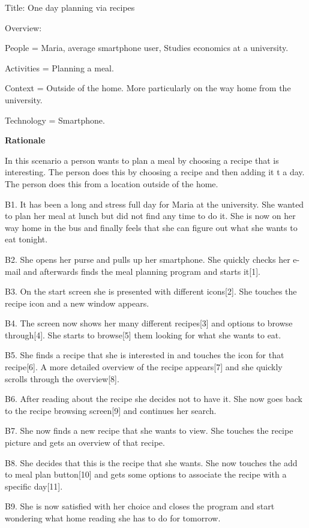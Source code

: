 Title: One day planning via recipes

Overview:

	People = Maria, average smartphone user, Studies economics at a university. 
	
	Activities = Planning a meal.

	Context = Outside of the home. More particularly on the way home from the university.

	Technology = Smartphone.

\textbf{Rationale}

In this scenario a person wants to plan a meal by choosing a recipe that is interesting. The person does this by choosing a recipe and then adding it t a day. The person does this from a location outside of the home. 

	B1. It has been a long and stress full day for Maria at the university. She wanted to plan her meal at lunch but did not find any time to do it. She is now on her way home in the bus and finally feels that she can figure out what she wants to eat tonight.

	B2. She opens her purse and pulls up her smartphone. She quickly checks her e-mail and afterwards finds the meal planning program and starts it[1]. 

	B3. On the start screen she is presented with different icons[2]. She touches the recipe icon and a new window appears.

	B4. The screen now shows her many different recipes[3] and options to browse through[4]. She starts to browse[5] them looking for what she wants to eat. 

	B5. She finds a recipe that she is interested in and touches the icon for that recipe[6]. A more detailed overview of the recipe appears[7] and she quickly scrolls through the overview[8].

	B6. After reading about the recipe she decides not to have it. She now goes back to the recipe browsing screen[9] and continues her search.

	B7. She now finds a new recipe that she wants to view. She touches the recipe picture and gets an overview of that recipe. 

	B8. She decides that this is the recipe that she wants. She now touches the add to meal plan button[10] and gets some options to associate the recipe with a specific day[11].

	B9. She is now satisfied with her choice and closes the program and start wondering what home reading she has to do for tomorrow.
	

